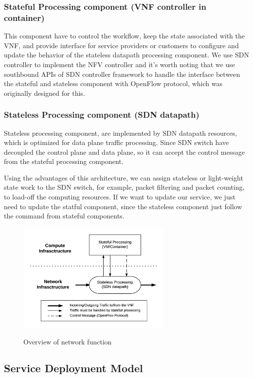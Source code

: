 \documentclass[journal]{IEEEtran}
\begin{document}
\subsubsection{Stateful Processing component (VNF controller in container)}
This component have to control the workflow, keep the state associated with the VNF, and provide interface for service providers or customers to configure and update the behavior of the stateless datapath processing component. We use SDN controller to implement the NFV controller and it’s worth noting that we use southbound APIs of SDN controller framework to handle the interface between the stateful and stateless component with OpenFlow protocol, which was originally designed for this.

\subsubsection{Stateless Processing component (SDN datapath)}
Stateless processing component, are implemented by SDN datapath resources, which is optimized for data plane traffic processing. Since SDN switch have decoupled the control plane and data plane, so it can accept the control message from the stateful processing component.

Using the advantages of this architecture, we can assign stateless or light-weight state work to the SDN switch, for example, packet filtering and packet counting, to load-off the computing resources. If we want to update our service, we just need to update the statful component, since the stateless component just follow the command from stateful components.

\begin{figure}[!t]
\centering
\caption{Overview of network function}
\includegraphics[width=3in]{./figures/nfv_overview}
\label{fig:nfv_overview}
\end{figure}


\subsection{Service Deployment Model}\label{ssec:vcpe_deploy}
\end{document}
